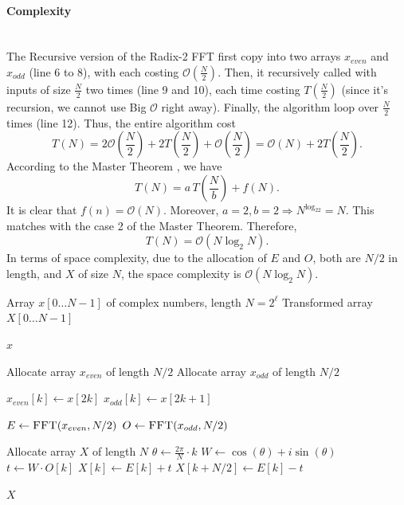 \documentclass{article}
\begin{document}
\paragraph{Complexity}~{} \\
The Recursive version of the Radix-2 FFT first copy into two arrays $x_{even}$ and $x_{odd}$ (line 6 to 8), with each costing $\mathcal{O}\left(\frac{N}{2}\right)$. Then, it recursively called with inputs of size $\frac{N}{2}$ two times (line 9 and 10), each time costing $T\left(\frac{N}{2}\right)$ (since it's recursion, we cannot use Big $\mathcal{O}$ right away). Finally, the algorithm loop over $\frac{N}{2}$ times (line 12). Thus, the entire algorithm cost $$T(N) = 2\mathcal{O}\left(\frac{N}{2}\right) + 2T\left(\frac{N}{2}\right) + \mathcal{O}\left(\frac{N}{2}\right) = \mathcal{O}\left({N}\right) + 2T\left(\frac{N}{2}\right).$$
According to the Master Theorem \cite{thomas2009introduction}, we have
$$T(N) = a \, T\left(\frac{N}{b}\right) + f(N).$$
It is clear that $f(n) = \mathcal{O}(N)$. Moreover, $a = 2, b = 2 \Rightarrow N^{\log_22} = N$. This matches with the case 2 of the Master Theorem. Therefore,
$$T(N) = \mathcal{O}(N\log_2N).$$
In terms of space complexity, due to the allocation of $E$ and $O$, both are $N/2$ in length, and $X$ of size $N$, the space complexity is $\mathcal{O}(N\log_2N)$.
\begin{algorithm}[H]
\caption{Recursive Radix-2 IFFT}
\begin{algorithmic}[1]
\Require Array $x[0 \dots N-1]$ of complex numbers, length $N = 2^\ell$
\Ensure Transformed array $X[0 \dots N-1]$

        \State \Return $x$
    \EndIf

    \State Allocate array $x_{even}$ of length $N/2$
    \State Allocate array $x_{odd}$ of length $N/2$
    
        \State $x_{even}[k] \gets x[2k]$
        \State $x_{odd}[k] \gets x[2k + 1]$
    \EndFor

    \State $E \gets \Call{FFT}{x_{even}, N/2}$ 
    \State $O \gets \Call{FFT}{x_{odd}, N/2}$  

    \State Allocate array $X$ of length $N$
        \State $\theta \gets \frac{2\pi}{N} \cdot k$
        \State $W \gets \cos(\theta) + i\sin(\theta)$
        \State $t \gets W \cdot O[k]$
        \State $X[k] \gets E[k] + t$
        \State $X[k + N/2] \gets E[k] - t$
    \EndFor

    \State \Return $X$
\EndProcedure
\end{algorithmic}
\end{algorithm}
\end{document}
